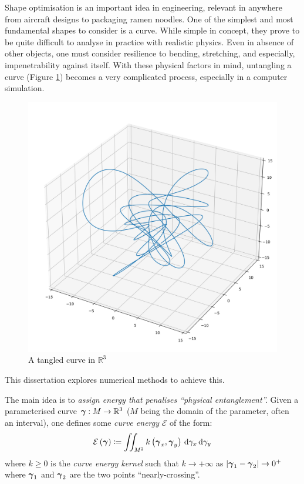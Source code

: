 \documentclass[../dissertation.tex]{subfiles}
\begin{document}
Shape optimisation is an important idea in engineering, relevant in anywhere from aircraft designs to packaging ramen noodles.
One of the simplest and most fundamental shapes to consider is a curve.
While simple in concept, they prove to be quite difficult to analyse in practice with realistic physics.
Even in absence of other objects, one must consider resilience to bending, stretching, and especially, impenetrability against itself.
With these physical factors in mind, untangling a curve (Figure \ref{fig: Knot}) becomes a very complicated process,
especially in a computer simulation.
\begin{figure}[tpb]
    \centering
    \includegraphics[scale=0.3]{sections/introductionImgs/knot}
    \caption{A tangled curve in $\mathbb{R}^3$}
    \label{fig: Knot}
\end{figure}
This dissertation explores numerical methods to achieve this.

The main idea is to \emph{assign energy that penalises ``physical entanglement''.}
Given a parameterised curve $\boldsymbol{\gamma}:M \rightarrow \mathbb{R}^3$ ($M$ being the domain of the parameter, often an interval),
one defines some \emph{curve energy} $\mathcal{E}$ of the form:
\begin{equation}
    \mathcal{E} \left( \boldsymbol{\gamma} \right) \coloneqq \iint_{M^2} k\left( \boldsymbol{\gamma}_x, \boldsymbol{\gamma}_y \right) \, \text{d} \gamma_x \, \text{d} \gamma_y
\end{equation}
where $k \geq 0$ is the \emph{curve energy kernel} such that $k \rightarrow +\infty$ as $\left| \boldsymbol{\gamma}_1 - \boldsymbol{\gamma}_2 \right| \rightarrow 0^+$ where $\boldsymbol{\gamma}_1$ and $\boldsymbol{\gamma}_2$ are the two points ``nearly-crossing''.
\end{document}

